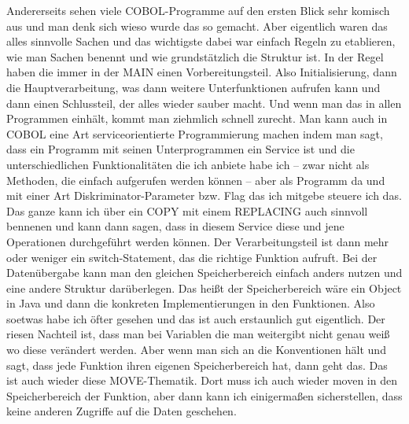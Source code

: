 {    Andererseits sehen viele COBOL-Programme auf den ersten Blick sehr komisch aus und man denk sich wieso wurde das so gemacht. Aber eigentlich waren das alles sinnvolle Sachen und das wichtigste dabei war einfach Regeln zu etablieren, wie man Sachen benennt und wie grundstätzlich die Struktur ist. In der Regel haben die immer in der MAIN einen Vorbereitungsteil. Also Initialisierung, dann die Hauptverarbeitung, was dann weitere Unterfunktionen aufrufen kann und dann einen Schlussteil, der alles wieder sauber macht. Und wenn man das in allen Programmen einhält, kommt man ziehmlich schnell zurecht. 
\medskip
    Man kann auch in COBOL eine Art serviceorientierte Programmierung machen indem man sagt, dass ein Programm mit seinen Unterprogrammen ein Service ist und die unterschiedlichen Funktionalitäten die ich anbiete habe ich -- zwar nicht als Methoden, die einfach aufgerufen werden können -- aber als Programm da und mit einer Art Diskriminator-Parameter bzw. Flag das ich mitgebe steuere ich das. Das ganze kann ich über ein COPY mit einem REPLACING auch sinnvoll bennenen und kann dann sagen, dass in diesem Service diese und jene Operationen durchgeführt werden können. Der Verarbeitungsteil ist dann mehr oder weniger ein switch-Statement, das die richtige Funktion aufruft. Bei der Datenübergabe kann man den gleichen Speicherbereich einfach anders nutzen und eine andere Struktur darüberlegen. Das heißt der Speicherbereich wäre ein Object in Java und dann die konkreten Implementierungen in den Funktionen. Also soetwas habe ich öfter gesehen und das ist auch erstaunlich gut eigentlich. Der riesen Nachteil ist, dass man bei Variablen die man weitergibt nicht genau weiß wo diese verändert werden. Aber wenn man sich an die Konventionen hält und sagt, dass jede Funktion ihren eigenen Speicherbereich hat, dann geht das. Das ist auch wieder diese MOVE-Thematik. Dort muss ich auch wieder moven in den Speicherbereich der Funktion, aber dann kann ich einigermaßen sicherstellen, dass keine anderen Zugriffe auf die Daten geschehen. 
\medskip
}
